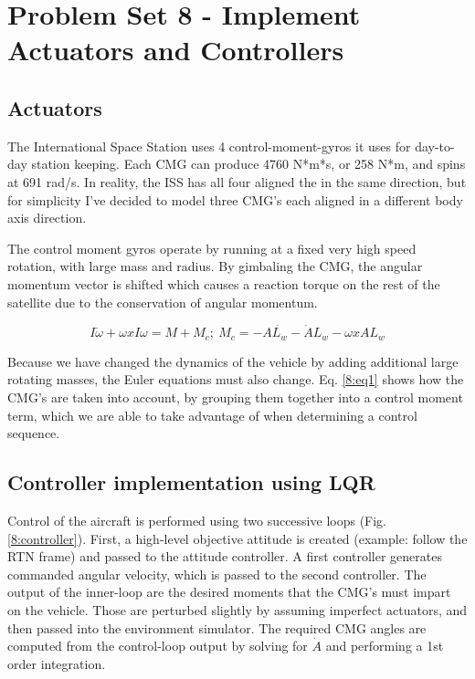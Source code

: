 \documentclass[12pt, letterpaper]{article}
\begin{document}
\section{Problem Set 8 - Implement Actuators and Controllers}

\subsection{Actuators}

The International Space Station uses 4 control-moment-gyros it uses for day-to-day station keeping. Each CMG can produce 4760 N*m*s, or 258 N*m, and spins at 691 rad/s. In reality, the ISS has all four aligned the in the same direction, but for simplicity I've decided to model three CMG's each aligned in a different body axis direction.

The control moment gyros operate by running at a fixed very high speed rotation, with large mass and radius. By gimbaling the CMG, the angular momentum vector is shifted which causes a reaction torque on the rest of the satellite due to the conservation of angular momentum.


\begin{equation}
I\dot{\omega} + \omega x I\omega = M + M_c;\ M_c = -A\dot{L_w}-\dot{A}L_w-\omega x AL_w
\label{8:eq1}
\end{equation}

Because we have changed the dynamics of the vehicle by adding additional large rotating masses, the Euler equations must also change. Eq. \ref{8:eq1} shows how the CMG's are taken into account, by grouping them together into a control moment term, which we are able to take advantage of when determining a control sequence. 

\subsection{Controller implementation using LQR}

Control of the aircraft is performed using two successive loops (Fig. \ref{8:controller}). First, a high-level objective attitude is created (example: follow the RTN frame) and passed to the attitude controller. A first controller generates commanded angular velocity, which is passed to the second controller. The output of the inner-loop are the desired moments that the CMG's must impart on the vehicle. Those are perturbed slightly by assuming imperfect actuators, and then passed into the environment simulator. The required CMG angles are computed from the control-loop output by solving for $\dot{A}$ and performing a 1st order integration.
\end{document}
